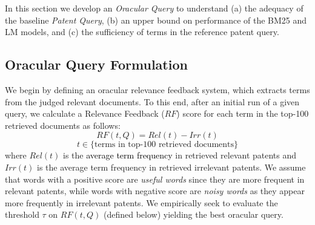 %

In this section we develop an \emph{Oracular Query} to understand (a)
the adequacy of the baseline
\emph{Patent Query}, (b) an upper bound on performance of the
BM25 and LM models, and (c) the sufficiency of terms in the reference
patent query.

\subsection{Oracular Query Formulation}

We begin by defining an oracular relevance feedback system, which
extracts terms from the judged relevant documents. To this end, after an initial run of a given query, we
calculate a Relevance Feedback ($\mathit{RF}$) score for each term in the top-100
retrieved documents as follows:
\begin{equation}
RF(t,Q)=Rel(t)-Irr(t) 
 \label{eq:score}
\end{equation}\vspace*{-5ex}
\begin{displaymath}t\in \lbrace \mbox{terms in top-100 retrieved documents}\rbrace\end{displaymath}
where $ \mathit{Rel(t)} $ is the \textcolor{black}{average term frequency} in retrieved relevant patents and $ \mathit{Irr(t)} $ is the average term frequency in retrieved irrelevant patents. We assume that words with a positive score are \emph{useful words} since they are more frequent in relevant patents, while words with negative score are \emph{noisy words} as they appear more frequently in irrelevant patents. We empirically seek to evaluate the threshold $\tau$ on $RF(t,Q)$ (defined below) yielding the best oracular query.

